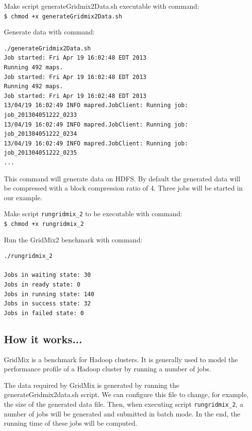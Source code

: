 Make script generateGridmix2Data.sh executable with command: \\
\verb|$ chmod +x generateGridmix2Data.sh|

Generate data with command:
\lstset{style=bashstyle}
\begin{lstlisting}
./generateGridmix2Data.sh
Job started: Fri Apr 19 16:02:48 EDT 2013
Running 492 maps.
Job started: Fri Apr 19 16:02:48 EDT 2013
Running 492 maps.
Job started: Fri Apr 19 16:02:48 EDT 2013
13/04/19 16:02:49 INFO mapred.JobClient: Running job: job_201304051222_0233
13/04/19 16:02:49 INFO mapred.JobClient: Running job: job_201304051222_0234
13/04/19 16:02:49 INFO mapred.JobClient: Running job: job_201304051222_0235
...
\end{lstlisting}

\begin{info}
This command will generate data on HDFS. By default the generated data will be compressed with a block compression ratio of 4. Three jobs will be started in our example.
\end{info}

Make script \verb|rungridmix_2| to be executable with command: \\
\verb|$ chmod +x rungridmix_2|

Run the GridMix2 benchmark with command:
\lstset{style=bashstyle}
\begin{lstlisting}
./rungridmix_2

Jobs in waiting state: 30
Jobs in ready state: 0
Jobs in running state: 140
Jobs in success state: 32
Jobs in failed state: 0
\end{lstlisting}

\subsection*{How it works...}
GridMix is a benchmark for Hadoop clusters. It is generally used to model the performance profile of a Hadoop cluster by running a number of jobs.

The data required by GridMix is generated by running the generateGridmix2data.sh script. We can configure this file to change, for example, the size of the generated data file. Then, when executing script \verb|rungridmix_2|, a number of jobs will be generated and submitted in batch mode. In the end, the running time of these jobs will be computed.

